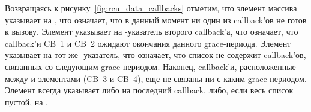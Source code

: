 Возвращаясь к рисунку~\ref{fig:rcu_data_callbacks} отметим,
что элемент массива  указывает на ,
что означает, что в данный момент ни один из callback'ов не готов к вызову.
Элемент  указывает на -указатель
второго callback'а, что означает, что callback'и CB~1 и CB~2 ожидают окончания данного
grace-периода.
Элемент  указывает на тот же
-указатель, что означает, что список не содержит callback'ов,
связанных со следующим grace-периодом.
Наконец, callback'и, расположенные между  и
 элементами (CB~3 и CB~4),
еще не связаны ни с каким grace-периодом.
Элемент  всегда указывает либо на последний
callback, либо, если весь список пустой, на .

